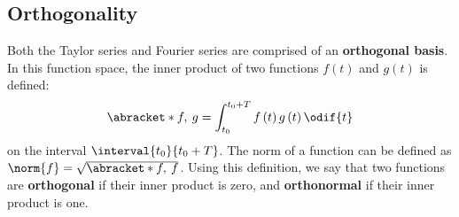 \documentclass{article}
\begin{document}
\subsection{Orthogonality}
Both the Taylor series and Fourier series are comprised of an
\textbf{orthogonal basis}. In this function space, the inner product of
two functions \(f\left( t \right)\) and \(g\left( t \right)\) is
defined:
\begin{equation*}
    \abracket*{f,\: g} = \int_{t_0}^{t_0 + T} f\left( t \right) g\left( t \right) \odif{t}
\end{equation*}
on the interval \(\interval{t_0}{t_0 + T}\). The norm of a function can
be defined as \(\norm{f} = \sqrt{\abracket*{f,\: f}}\). Using this
definition, we say that two functions are \textbf{orthogonal} if their
inner product is zero, and \textbf{orthonormal} if their inner product
is one.
\end{document}
